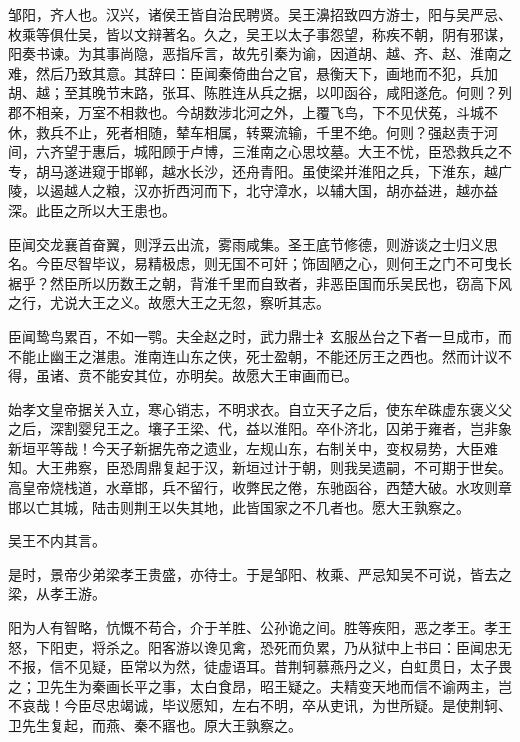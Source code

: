 \documentclass[12pt,UTF8]{ctexbook}
\begin{document}
邹阳，齐人也。汉兴，诸侯王皆自治民聘贤。吴王濞招致四方游士，阳与吴严忌、枚乘等俱仕吴，皆以文辩著名。久之，吴王以太子事怨望，称疾不朝，阴有邪谋，阳奏书谏。为其事尚隐，恶指斥言，故先引秦为谕，因道胡、越、齐、赵、淮南之难，然后乃致其意。其辞曰：臣闻秦倚曲台之官，悬衡天下，画地而不犯，兵加胡、越；至其晚节末路，张耳、陈胜连从兵之据，以叩函谷，咸阳遂危。何则？列郡不相亲，万室不相救也。今胡数涉北河之外，上覆飞鸟，下不见伏菟，斗城不休，救兵不止，死者相随，辇车相属，转粟流输，千里不绝。何则？强赵责于河间，六齐望于惠后，城阳顾于卢博，三淮南之心思坟墓。大王不忧，臣恐救兵之不专，胡马遂进窥于邯郸，越水长沙，还舟青阳。虽使梁并淮阳之兵，下淮东，越广陵，以遏越人之粮，汉亦折西河而下，北守漳水，以辅大国，胡亦益进，越亦益深。此臣之所以大王患也。



臣闻交龙襄首奋翼，则浮云出流，雾雨咸集。圣王底节修德，则游谈之士归义思名。今臣尽智毕议，易精极虑，则无国不可奸；饰固陋之心，则何王之门不可曳长裾乎？然臣所以历数王之朝，背淮千里而自致者，非恶臣国而乐吴民也，窃高下风之行，尤说大王之义。故愿大王之无忽，察听其志。



臣闻鸷鸟累百，不如一鹗。夫全赵之时，武力鼎士衤玄服丛台之下者一旦成市，而不能止幽王之湛患。淮南连山东之侠，死士盈朝，不能还厉王之西也。然而计议不得，虽诸、贲不能安其位，亦明矣。故愿大王审画而已。



始孝文皇帝据关入立，寒心销志，不明求衣。自立天子之后，使东牟硃虚东褒义父之后，深割婴兒王之。壤子王梁、代，益以淮阳。卒仆济北，囚弟于雍者，岂非象新垣平等哉！今天子新据先帝之遗业，左规山东，右制关中，变权易势，大臣难知。大王弗察，臣恐周鼎复起于汉，新垣过计于朝，则我吴遗嗣，不可期于世矣。高皇帝烧栈道，水章邯，兵不留行，收弊民之倦，东驰函谷，西楚大破。水攻则章邯以亡其城，陆击则荆王以失其地，此皆国家之不几者也。愿大王孰察之。



吴王不内其言。



是时，景帝少弟梁孝王贵盛，亦待士。于是邹阳、枚乘、严忌知吴不可说，皆去之梁，从孝王游。



阳为人有智略，忼慨不苟合，介于羊胜、公孙诡之间。胜等疾阳，恶之孝王。孝王怒，下阳吏，将杀之。阳客游以谗见禽，恐死而负累，乃从狱中上书曰：臣闻忠无不报，信不见疑，臣常以为然，徒虚语耳。昔荆轲慕燕丹之义，白虹贯日，太子畏之；卫先生为秦画长平之事，太白食昂，昭王疑之。夫精变天地而信不谕两主，岂不哀哉！今臣尽忠竭诚，毕议愿知，左右不明，卒从吏讯，为世所疑。是使荆轲、卫先生复起，而燕、秦不寤也。原大王孰察之。
\end{document}
